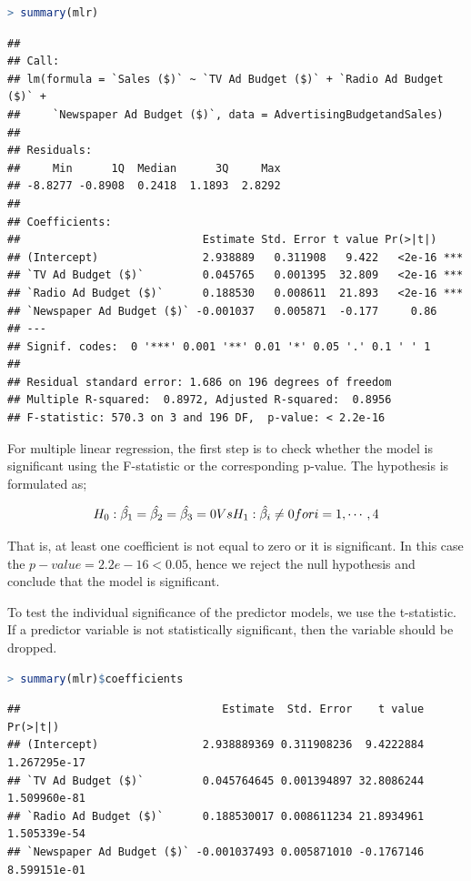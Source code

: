 \documentclass[
]{article}
\begin{document}
\begin{lstlisting}[language=R]
> summary(mlr)
\end{lstlisting}

\begin{lstlisting}
## 
## Call:
## lm(formula = `Sales ($)` ~ `TV Ad Budget ($)` + `Radio Ad Budget ($)` + 
##     `Newspaper Ad Budget ($)`, data = AdvertisingBudgetandSales)
## 
## Residuals:
##     Min      1Q  Median      3Q     Max 
## -8.8277 -0.8908  0.2418  1.1893  2.8292 
## 
## Coefficients:
##                            Estimate Std. Error t value Pr(>|t|)    
## (Intercept)                2.938889   0.311908   9.422   <2e-16 ***
## `TV Ad Budget ($)`         0.045765   0.001395  32.809   <2e-16 ***
## `Radio Ad Budget ($)`      0.188530   0.008611  21.893   <2e-16 ***
## `Newspaper Ad Budget ($)` -0.001037   0.005871  -0.177     0.86    
## ---
## Signif. codes:  0 '***' 0.001 '**' 0.01 '*' 0.05 '.' 0.1 ' ' 1
## 
## Residual standard error: 1.686 on 196 degrees of freedom
## Multiple R-squared:  0.8972, Adjusted R-squared:  0.8956 
## F-statistic: 570.3 on 3 and 196 DF,  p-value: < 2.2e-16
\end{lstlisting}

For multiple linear regression, the first step is to check whether the
model is significant using the F-statistic or the corresponding p-value.
The hypothesis is formulated as;

\[H_0:\hat{\beta_1}=\hat{\beta_2}=\hat{\beta_3}=0 \space\space Vs \space\space H_1:\hat{\beta_i}\neq0 \space for \space i=1,\cdots ,4\]

That is, at least one coefficient is not equal to zero or it is
significant. In this case the \(p-value =2.2e-16<0.05\), hence we reject
the null hypothesis and conclude that the model is significant.

To test the individual significance of the predictor models, we use the
t-statistic. If a predictor variable is not statistically significant,
then the variable should be dropped.

\begin{lstlisting}[language=R]
> summary(mlr)$coefficients
\end{lstlisting}

\begin{lstlisting}
##                               Estimate  Std. Error    t value     Pr(>|t|)
## (Intercept)                2.938889369 0.311908236  9.4222884 1.267295e-17
## `TV Ad Budget ($)`         0.045764645 0.001394897 32.8086244 1.509960e-81
## `Radio Ad Budget ($)`      0.188530017 0.008611234 21.8934961 1.505339e-54
## `Newspaper Ad Budget ($)` -0.001037493 0.005871010 -0.1767146 8.599151e-01
\end{lstlisting}
\end{document}
